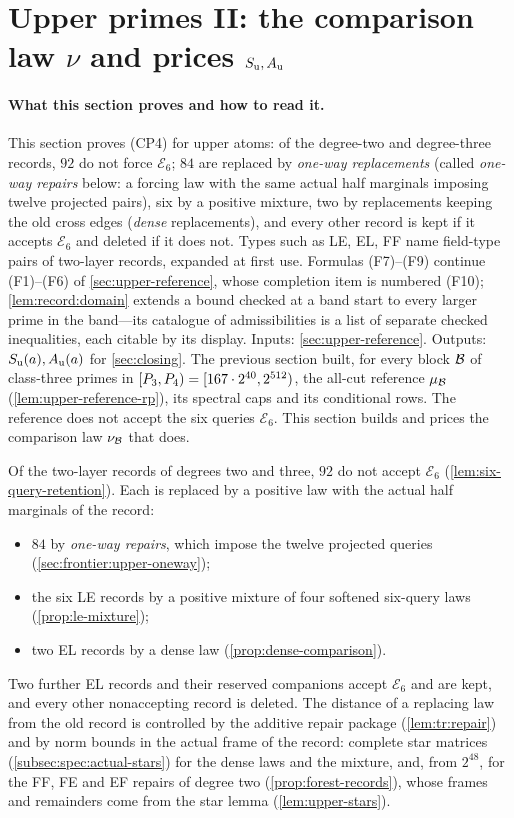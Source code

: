 
\section{Upper primes II: the comparison law \texorpdfstring{$\nu$}{nu} and prices \texorpdfstring{$S_{\rm u},A_{\rm u}$}{S\_u,A\_u}}
\label{sec:upper-comparison}

\paragraph{What this section proves and how to read it.}
This section proves (CP4) for upper atoms: of the degree-two and
degree-three records, $92$ do not force $\mathcal E_6$; $84$ are
replaced by \emph{one-way replacements} (called \emph{one-way
repairs} below: a forcing law with the same actual half marginals
imposing twelve projected pairs), six by a positive mixture, two
by replacements keeping the old cross edges (\emph{dense}
replacements), and every other record is kept if it accepts
$\mathcal E_6$ and deleted if it does not. Types such as LE,
EL, FF name field-type pairs of two-layer records, expanded at
first use. Formulas (F7)--(F9) continue (F1)--(F6) of
\cref{sec:upper-reference}, whose completion item is numbered (F10);
\cref{lem:record:domain} extends a bound
checked at a band start to every larger prime in the band---its
catalogue of admissibilities is a list of separate checked
inequalities, each citable by its display. Inputs:
\cref{sec:upper-reference}. Outputs: $S_{\rm u}(a),A_{\rm u}(a)$ for
\cref{sec:closing}.
The previous section built, for every block $\mathcal B$ of class-three primes in
$[P_3,P_4)=[167\cdot2^{40},2^{512})$, the all-cut reference $\mu_\mathcal B$
(\cref{lem:upper-reference-rp}), its spectral caps and its conditional rows.
The reference does not accept the six queries $\mathcal E_6$. This section
builds and prices the comparison law $\nu_\mathcal B$ that does.

Of the two-layer records of degrees two and three, $92$ do not accept
$\mathcal E_6$ (\cref{lem:six-query-retention}). Each is replaced by a positive
law with the actual half marginals of the record:
\begin{itemize}
\item $84$ by \emph{one-way repairs}, which impose the twelve projected queries
 (\cref{sec:frontier:upper-oneway});
\item the six LE records by a positive mixture of four softened six-query laws
 (\cref{prop:le-mixture});
\item two EL records by a dense law (\cref{prop:dense-comparison}).
\end{itemize}
Two further EL records and their reserved companions accept $\mathcal E_6$ and
are kept, and every other nonaccepting record is deleted. The distance of a
replacing law from the old record is controlled by the additive repair package
(\cref{lem:tr:repair}) and by norm bounds in the actual frame of the record:
complete star matrices (\cref{subsec:spec:actual-stars}) for the dense laws and
the mixture, and, from $2^{48}$, for the FF, FE and EF repairs of degree two
(\cref{prop:forest-records}), whose frames and remainders come from the star
lemma (\cref{lem:upper-stars}).

